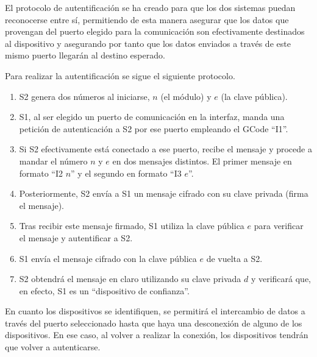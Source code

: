 El protocolo de autentificación se ha creado para que los dos sistemas puedan reconocerse entre sí, permitiendo de esta manera asegurar que los datos que provengan del puerto elegido para la comunicación son efectivamente destinados al dispositivo y asegurando por tanto que los datos enviados a través de este mismo puerto llegarán al destino esperado.

Para realizar la autentificación se sigue el siguiente protocolo.

\begin{enumerate}
  \item \ac{S2} genera dos números al iniciarse, $n$ (el módulo) y $e$ (la clave pública).
  \item \ac{S1}, al ser elegido un puerto de comunicación en la interfaz, manda una petición de autenticación a \ac{S2} por ese puerto empleando el GCode ``I1''.
  \item Si \ac{S2} efectivamente está conectado a ese puerto, recibe el mensaje y procede a mandar el número $n$ y $e$ en dos mensajes distintos. El primer mensaje en formato ``I2 $n$'' y el segundo en formato ``I3 $e$''.
  \item Posteriormente, \ac{S2} envía a \ac{S1} un mensaje cifrado con su clave privada (firma el mensaje).
  \item Tras recibir este mensaje firmado, \ac{S1} utiliza la clave pública $e$ para verificar el mensaje y autentificar a \ac{S2}.
  \item \ac{S1} envía el mensaje cifrado con la clave pública $e$ de vuelta a \ac{S2}.
  \item \ac{S2} obtendrá el mensaje en claro utilizando su clave privada $d$ y verificará que, en efecto, \ac{S1} es un ``dispositivo de confianza''.
\end{enumerate}

En cuanto los dispositivos se identifiquen, se permitirá el intercambio de datos a través del puerto seleccionado hasta que haya una desconexión de alguno de los dispositivos. En ese caso, al volver a realizar la conexión, los dispositivos tendrán que volver a autenticarse.